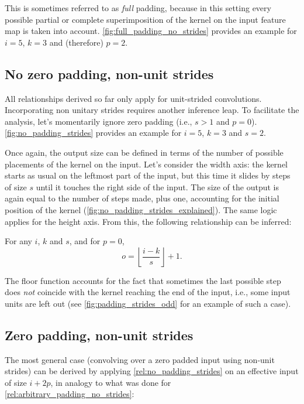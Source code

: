 \noindent This is sometimes referred to as {\em full\/} padding, because in this
setting every possible partial or complete superimposition of the kernel on the
input feature map is taken into account. \autoref{fig:full_padding_no_strides}
provides an example for $i = 5$, $k = 3$ and (therefore) $p = 2$.

\subsection{No zero padding, non-unit strides}

All relationships derived so far only apply for unit-strided convolutions.
Incorporating non unitary strides requires another inference leap. To
facilitate the analysis, let's momentarily ignore zero padding (i.e., $s > 1$
and $p = 0$). \autoref{fig:no_padding_strides} provides an example for $i =
5$, $k = 3$ and $s = 2$.

Once again, the output size can be defined in terms of the number of possible
placements of the kernel on the input. Let's consider the width axis: the
kernel starts as usual on the leftmost part of the input, but this time it
slides by steps of size $s$ until it touches the right side of the input. The
size of the output is again equal to the number of steps made, plus one,
accounting for the initial position of the kernel
(\autoref{fig:no_padding_strides_explained}). The same logic applies for the
height axis. From this, the following relationship can be inferred:

\begin{relationship}\label{rel:no_padding_strides}
For any $i$, $k$ and $s$, and for $p = 0$,
\begin{equation*}
    o = \left\lfloor \frac{i - k}{s} \right\rfloor + 1.
\end{equation*}
\end{relationship}

\noindent The floor function accounts for the fact that sometimes the last
possible step does {\em not\/} coincide with the kernel reaching the end of the
input, i.e., some input units are left out (see
\autoref{fig:padding_strides_odd} for an example of such a case).

\subsection{Zero padding, non-unit strides}

The most general case (convolving over a zero padded input using non-unit
strides) can be derived by applying \autoref{rel:no_padding_strides} on an
effective input of size $i + 2p$, in analogy to what was done for
\autoref{rel:arbitrary_padding_no_strides}:

